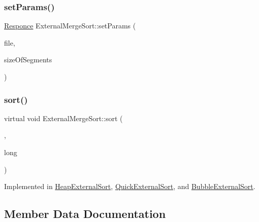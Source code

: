 \hypertarget{class_external_merge_sort_a2a27571acdf4f42e34798663e37f5e0b}{}\label{class_external_merge_sort_a2a27571acdf4f42e34798663e37f5e0b} 
\subsubsection{\texorpdfstring{set\+Params()}{setParams()}}
{\footnotesize\ttfamily \hyperlink{_structures_8h_a9864d6ef28dd6e38416afac4426b3491}{Responce} External\+Merge\+Sort\+::set\+Params (\begin{DoxyParamCaption}\item[{\hyperlink{class_file_manager}{File\+Manager} $\ast$}]{file,  }\item[{long long}]{size\+Of\+Segments }\end{DoxyParamCaption})}

\hypertarget{class_external_merge_sort_af6412221cc797a846243a343ccc12dba}{}\label{class_external_merge_sort_af6412221cc797a846243a343ccc12dba} 
\subsubsection{\texorpdfstring{sort()}{sort()}}
{\footnotesize\ttfamily virtual void External\+Merge\+Sort\+::sort (\begin{DoxyParamCaption}\item[{long long $\ast$}]{,  }\item[{long}]{long }\end{DoxyParamCaption})\hspace{0.3cm}{\ttfamily [pure virtual]}}



Implemented in \hyperlink{class_heap_external_sort_a908087ce13932b268a35e1184a05ea44}{Heap\+External\+Sort}, \hyperlink{class_quick_external_sort_adafdd4faded04218c1a131bf55e3c90d}{Quick\+External\+Sort}, and \hyperlink{class_bubble_external_sort_ac2c8c1a8dad0f0f99a176d3641b7625c}{Bubble\+External\+Sort}.



\subsection{Member Data Documentation}
\hypertarget{class_external_merge_sort_ac9cb039a5cda56e66aecbc17465dd237}{}\label{class_external_merge_sort_ac9cb039a5cda56e66aecbc17465dd237} 
